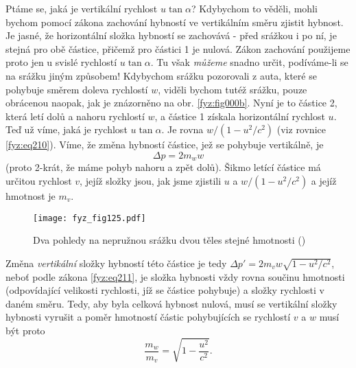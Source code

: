     Ptáme se, jaká je vertikální rychlost \(u\tan\alpha\)? Kdybychom to věděli, mohli bychom pomocí 
    zákona zachování hybností ve vertikálním směru zjistit hybnost. Je jasné, že horizontální 
    složka hybností se zachovává - před srážkou i po ní, je stejná pro obě částice, přičemž pro 
    částici 1 je nulová. Zákon zachování použijeme proto jen u svislé rychlostí \(u\tan\alpha\). Tu 
    však \emph{můžeme} snadno určit, podíváme-li se na srážku jiným způsobem! Kdybychom srážku 
    pozorovali z auta, které se pohybuje směrem doleva rychlostí \(w\), viděli bychom tutéž srážku, 
    pouze obrácenou naopak, jak je znázorněno na obr. \ref{fyz:fig000b}. Nyní je to částice 2, 
    která letí dolů a nahoru rychlostí \(w\), a částice 1 získala horizontální rychlost \(u\). Teď 
    už víme, jaká je rychlost \(u\tan\alpha\). Je rovna \(w/(1 - u^2/c^2)\) (viz rovnice 
    \ref{fyz:eq210}). Víme, že změna hybností částice, jež se pohybuje vertikálně, je
    \begin{equation}\label{fyz:eq212}
      \Delta p = 2m_ww
    \end{equation}
    (proto 2-krát, že máme pohyb nahoru a zpět dolů). Šikmo letící částice má určitou rychlost 
    \(v\), jejíž složky jsou, jak jsme zjistili \(u\) a \(w/(1 - u^2/c^2)\) a jejíž hmotnost je 
    \(m_v\).
    
    \begin{figure}[ht!]  %
      \centering
      \texttt{[image: fyz\_fig125.pdf]}
      \caption{Dva pohledy na nepružnou srážku dvou těles stejné hmotnosti
               (\cite[s.~233]{Feynman01})}
      \label{fyz:fig125}
    \end{figure}
    
    Změna \emph{vertikální} složky hybností této částice je tedy \(\Delta p' =2m_vw\sqrt{1 - 
    u^2/c^2}\), neboť podle zákona \ref{fyz:eq211}, je složka hybnosti vždy rovna součinu hmotnosti 
    (odpovídající velikosti rychlosti, jíž se částice pohybuje) a složky rychlosti v daném směru. 
    Tedy, aby byla celková hybnost nulová, musí se vertikální složky hybnosti vyrušit a poměr 
    hmotností částic pohybujících se rychlostí \(v\) a \(w\) musí být proto
    \begin{equation}\label{fyz:eq213}
      \frac{m_w}{m_v} = \sqrt{1 - \dfrac{u^2}{c^2}}.
    \end{equation}
    
